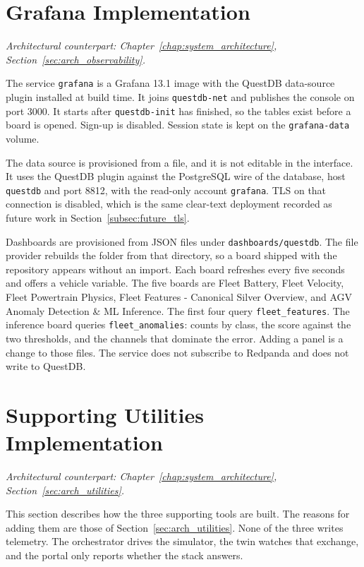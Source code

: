 \section{Grafana Implementation}
\label{sec:grafana_implementation}
\textit{Architectural counterpart: Chapter~\ref{chap:system_architecture}, Section~\ref{sec:arch_observability}.}

The service \texttt{grafana} is a Grafana 13.1 image with the QuestDB data-source plugin installed at build time. It joins \texttt{questdb-net} and publishes the console on port 3000. It starts after \texttt{questdb-init} has finished, so the tables exist before a board is opened. Sign-up is disabled. Session state is kept on the \texttt{grafana-data} volume.

The data source is provisioned from a file, and it is not editable in the interface. It uses the QuestDB plugin against the PostgreSQL wire of the database, host \texttt{questdb} and port 8812, with the read-only account \texttt{grafana}. TLS on that connection is disabled, which is the same clear-text deployment recorded as future work in Section~\ref{subsec:future_tls}.

Dashboards are provisioned from JSON files under \texttt{dashboards/questdb}. The file provider rebuilds the folder from that directory, so a board shipped with the repository appears without an import. Each board refreshes every five seconds and offers a vehicle variable. The five boards are Fleet Battery, Fleet Velocity, Fleet Powertrain Physics, Fleet Features - Canonical Silver Overview, and AGV Anomaly Detection \& ML Inference. The first four query \texttt{fleet\_features}. The inference board queries \texttt{fleet\_anomalies}: counts by class, the score against the two thresholds, and the channels that dominate the error. Adding a panel is a change to those files. The service does not subscribe to Redpanda and does not write to QuestDB.

\section{Supporting Utilities Implementation}
\label{sec:utilities_implementation}
\textit{Architectural counterpart: Chapter~\ref{chap:system_architecture}, Section~\ref{sec:arch_utilities}.}

This section describes how the three supporting tools are built. The reasons for adding them are those of Section~\ref{sec:arch_utilities}. None of the three writes telemetry. The orchestrator drives the simulator, the twin watches that exchange, and the portal only reports whether the stack answers.


